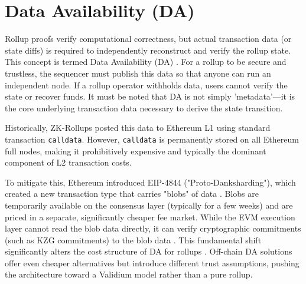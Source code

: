 \section{Data Availability (DA)}

\label{sec:data_availability}

Rollup proofs verify computational correctness, but actual transaction data (or state diffs) is required to independently reconstruct and verify the rollup state. This concept is termed Data Availability (DA) \citep{saif2024dataavailability}. For a rollup to be secure and trustless, the sequencer must publish this data so that anyone can run an independent node. If a rollup operator withholds data, users cannot verify the state or recover funds. It must be noted that DA is not simply 'metadata'—it is the core underlying transaction data necessary to derive the state transition.

Historically, ZK-Rollups posted this data to Ethereum L1 using standard transaction \texttt{calldata}. However, \texttt{calldata} is permanently stored on all Ethereum full nodes, making it prohibitively expensive and typically the dominant component of L2 transaction costs.

To mitigate this, Ethereum introduced EIP-4844 ("Proto-Danksharding"), which created a new transaction type that carries "blobs" of data \citep{eip4844}. Blobs are temporarily available on the consensus layer (typically for a few weeks) and are priced in a separate, significantly cheaper fee market. While the EVM execution layer cannot read the blob data directly, it can verify cryptographic commitments (such as KZG commitments) to the blob data \citep{eip4844}. This fundamental shift significantly alters the cost structure of DA for rollups \citep{saif2024dataavailability, lavaur2023modular}. Off-chain DA solutions offer even cheaper alternatives but introduce different trust assumptions, pushing the architecture toward a Validium model rather than a pure rollup.
